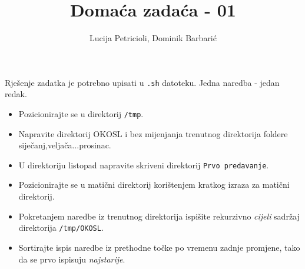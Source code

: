 \documentclass[12pt,a4paper]{article}
\newcommand{\shell}[1]{\texttt{#1}}
\begin{document}
	\title{Domaća zadaća - 01}
	\author{Lucija Petricioli, Dominik Barbarić}
	\maketitle
	Rješenje zadatka je potrebno upisati u \shell{.sh} datoteku. Jedna naredba - jedan redak.
	\begin{itemize}
		\item Pozicionirajte se u direktorij \shell{/tmp}.
		\item Napravite direktorij OKOSL i bez mijenjanja trenutnog direktorija foldere siječanj,veljača...prosinac.
		\item U direktoriju listopad napravite skriveni direktorij \shell{Prvo predavanje}.
		\item Pozicionirajte se u matični direktorij korištenjem kratkog izraza za matični direktorij.
		\item Pokretanjem naredbe iz trenutnog direktorija ispišite rekurzivno \textit{cijeli} sadržaj direktorija \shell{/tmp/OKOSL}.
		\item Sortirajte ispis naredbe iz prethodne točke po vremenu zadnje promjene, tako da se prvo ispisuju \textit{najstarije}.
	\end{itemize}
\end{document}
